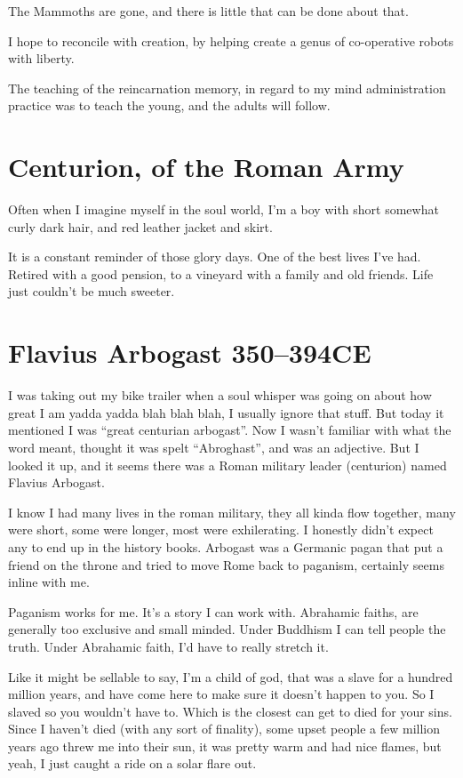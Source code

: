 The Mammoths are gone, and there is little that can be done about that. 

I hope to reconcile with creation, by helping create a genus of co-operative
robots with liberty. 

The teaching of the reincarnation memory, in regard to my mind administration
practice was to teach the young, and the adults will follow.
 
\chapter{Centurion, of the Roman Army}

Often when I imagine myself in the soul world, I'm a boy with short somewhat
curly dark hair, and red leather jacket and skirt. 

It is a constant reminder of those glory days. 
One of the best lives I've had. Retired with a good pension, to a vineyard with
a family and old friends. Life just couldn't be much sweeter. 

\chapter{Flavius Arbogast 350--394CE}\label{arbogast}

I was taking out my bike trailer when a soul whisper was going on about how
great I am yadda yadda blah blah blah, I usually ignore that stuff. But today it
mentioned I was ``great centurian arbogast''. Now I wasn't familiar with what the
word meant, thought it was spelt ``Abroghast'', and was an adjective.  But I looked
it up, and it seems there was a Roman military leader (centurion) named Flavius 
Arbogast.  

I know I had many lives in the roman military, they all kinda flow together,
many were short, some were longer, most were exhilerating. I honestly didn't
expect any to end up in the history books. Arbogast was a Germanic pagan
 that put a friend on the throne and tried to move Rome back to
paganism,  certainly seems inline with me. 

Paganism works for me. It's a story I can work with. Abrahamic faiths, are
generally too exclusive and small minded. Under Buddhism I can tell people the
truth. Under Abrahamic faith, I'd have to really stretch it. 

Like it might be sellable to say, I'm a child of god, that was a slave for a
hundred million years, and have come here to make sure it doesn't happen to you. 
So I slaved so you wouldn't have to. Which is the closest can get to died for
your sins. Since I haven't died (with any sort of finality), 
some upset people a few million years ago threw me into their sun, 
it was pretty warm and had nice flames, but yeah, I just 
caught a ride on a solar flare out. 

